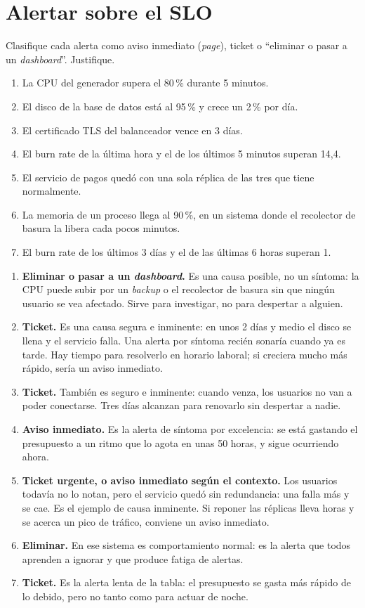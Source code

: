 \documentclass[variant=guia,cover=institutional,mode=screen]{ua-engineering-v6-article}
\begin{document}
\section{Alertar sobre el SLO}
\begin{uaexercise}
Clasifique cada alerta como aviso inmediato (\emph{page}), ticket o ``eliminar o pasar a un \emph{dashboard}''. Justifique.
\begin{enumerate}
\item La CPU del generador supera el 80\,\% durante 5 minutos.
\item El disco de la base de datos está al 95\,\% y crece un 2\,\% por día.
\item El certificado TLS del balanceador vence en 3 días.
\item El burn rate de la última hora y el de los últimos 5 minutos superan 14,4.
\item El servicio de pagos quedó con una sola réplica de las tres que tiene normalmente.
\item La memoria de un proceso llega al 90\,\%, en un sistema donde el recolector de basura la libera cada pocos minutos.
\item El burn rate de los últimos 3 días y el de las últimas 6 horas superan 1.
\end{enumerate}
\end{uaexercise}
\begin{uaanswer}
\begin{enumerate}
\item \textbf{Eliminar o pasar a un \emph{dashboard}.} Es una causa posible, no un síntoma: la CPU puede subir por un \emph{backup} o el recolector de basura sin que ningún usuario se vea afectado. Sirve para investigar, no para despertar a alguien.
\item \textbf{Ticket.} Es una causa segura e inminente: en unos 2 días y medio el disco se llena y el servicio falla. Una alerta por síntoma recién sonaría cuando ya es tarde. Hay tiempo para resolverlo en horario laboral; si creciera mucho más rápido, sería un aviso inmediato.
\item \textbf{Ticket.} También es seguro e inminente: cuando venza, los usuarios no van a poder conectarse. Tres días alcanzan para renovarlo sin despertar a nadie.
\item \textbf{Aviso inmediato.} Es la alerta de síntoma por excelencia: se está gastando el presupuesto a un ritmo que lo agota en unas 50 horas, y sigue ocurriendo ahora.
\item \textbf{Ticket urgente, o aviso inmediato según el contexto.} Los usuarios todavía no lo notan, pero el servicio quedó sin redundancia: una falla más y se cae. Es el ejemplo de causa inminente. Si reponer las réplicas lleva horas y se acerca un pico de tráfico, conviene un aviso inmediato.
\item \textbf{Eliminar.} En ese sistema es comportamiento normal: es la alerta que todos aprenden a ignorar y que produce fatiga de alertas.
\item \textbf{Ticket.} Es la alerta lenta de la tabla: el presupuesto se gasta más rápido de lo debido, pero no tanto como para actuar de noche.
\end{enumerate}
\end{uaanswer}
\end{document}
